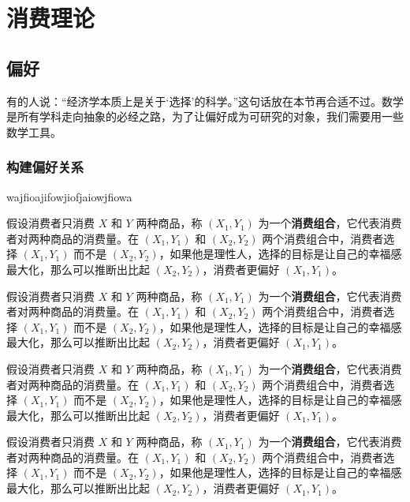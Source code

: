 \documentclass[../Main.tex]{subfiles}
\begin{document}
\chapter{消费理论}


\section{偏好}


有的人说：“经济学本质上是关于‘选择’的科学。”这句话放在本节再合适不过。数学是所有学科走向抽象的必经之路，为了让偏好成为可研究的对象，我们需要用一些数学工具。

\subsection{构建偏好关系}

wajfioajifowjiofjaiowjfiowa

假设消费者只消费 $X$ 和 $Y$ 两种商品，称 $\left(X_1,Y_1\right)$ 为一个\textbf{消费组合}，它代表消费者对两种商品的消费量。在 $\left(X_1,Y_1\right)$ 和 $\left(X_2,Y_2\right)$ 两个消费组合中，消费者选择 $\left(X_1,Y_1\right)$ 而不是 $\left(X_2,Y_2\right)$，如果他是理性人，选择的目标是让自己的幸福感最大化，那么可以推断出比起 $\left(X_2,Y_2\right)$，消费者更偏好 $\left(X_1,Y_1\right)$。

假设消费者只消费 $X$ 和 $Y$ 两种商品，称 $\left(X_1,Y_1\right)$ 为一个\textbf{消费组合}，它代表消费者对两种商品的消费量。在 $\left(X_1,Y_1\right)$ 和 $\left(X_2,Y_2\right)$ 两个消费组合中，消费者选择 $\left(X_1,Y_1\right)$ 而不是 $\left(X_2,Y_2\right)$，如果他是理性人，选择的目标是让自己的幸福感最大化，那么可以推断出比起 $\left(X_2,Y_2\right)$，消费者更偏好 $\left(X_1,Y_1\right)$。

假设消费者只消费 $X$ 和 $Y$ 两种商品，称 $\left(X_1,Y_1\right)$ 为一个\textbf{消费组合}，它代表消费者对两种商品的消费量。在 $\left(X_1,Y_1\right)$ 和 $\left(X_2,Y_2\right)$ 两个消费组合中，消费者选择 $\left(X_1,Y_1\right)$ 而不是 $\left(X_2,Y_2\right)$，如果他是理性人，选择的目标是让自己的幸福感最大化，那么可以推断出比起 $\left(X_2,Y_2\right)$，消费者更偏好 $\left(X_1,Y_1\right)$。

假设消费者只消费 $X$ 和 $Y$ 两种商品，称 $\left(X_1,Y_1\right)$ 为一个\textbf{消费组合}，它代表消费者对两种商品的消费量。在 $\left(X_1,Y_1\right)$ 和 $\left(X_2,Y_2\right)$ 两个消费组合中，消费者选择 $\left(X_1,Y_1\right)$ 而不是 $\left(X_2,Y_2\right)$，如果他是理性人，选择的目标是让自己的幸福感最大化，那么可以推断出比起 $\left(X_2,Y_2\right)$，消费者更偏好 $\left(X_1,Y_1\right)$。
\end{document}
